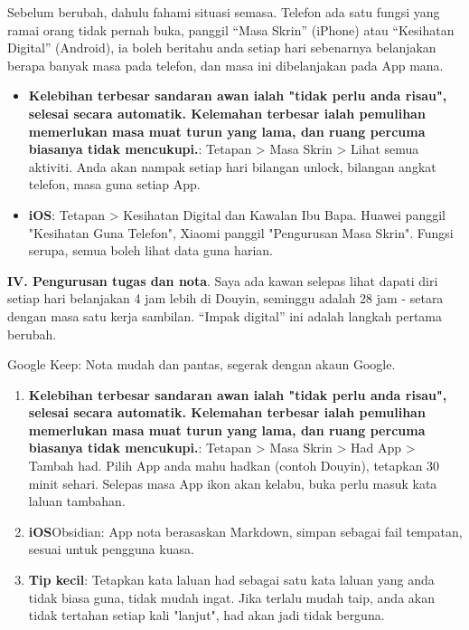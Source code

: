 


Sebelum berubah, dahulu fahami situasi semasa. Telefon ada satu fungsi yang ramai orang tidak pernah buka, panggil “Masa Skrin” (iPhone) atau “Kesihatan Digital” (Android), ia boleh beritahu anda setiap hari sebenarnya belanjakan berapa banyak masa pada telefon, dan masa ini dibelanjakan pada App mana.

\begin{itemize}
  \item \textbf{Kelebihan terbesar sandaran awan ialah "tidak perlu anda risau", selesai secara automatik. Kelemahan terbesar ialah pemulihan memerlukan masa muat turun yang lama, dan ruang percuma biasanya tidak mencukupi.}: Tetapan > Masa Skrin > Lihat semua aktiviti. Anda akan nampak setiap hari bilangan unlock, bilangan angkat telefon, masa guna setiap App.
  \item \textbf{iOS}: Tetapan > Kesihatan Digital dan Kawalan Ibu Bapa. Huawei panggil "Kesihatan Guna Telefon", Xiaomi panggil "Pengurusan Masa Skrin". Fungsi serupa, semua boleh lihat data guna harian.
\end{itemize}

\textbf{IV. Pengurusan tugas dan nota}. Saya ada kawan selepas lihat dapati diri setiap hari belanjakan 4 jam lebih di Douyin, seminggu adalah 28 jam - setara dengan masa satu kerja sambilan. “Impak digital” ini adalah langkah pertama berubah.


Google Keep: Nota mudah dan pantas, segerak dengan akaun Google.

\begin{enumerate}
  \item \textbf{Kelebihan terbesar sandaran awan ialah "tidak perlu anda risau", selesai secara automatik. Kelemahan terbesar ialah pemulihan memerlukan masa muat turun yang lama, dan ruang percuma biasanya tidak mencukupi.}: Tetapan > Masa Skrin > Had App > Tambah had. Pilih App anda mahu hadkan (contoh Douyin), tetapkan 30 minit sehari. Selepas masa App ikon akan kelabu, buka perlu masuk kata laluan tambahan.
  \item \textbf{iOS}Obsidian: App nota berasaskan Markdown, simpan sebagai fail tempatan, sesuai untuk pengguna kuasa.
  \item \textbf{Tip kecil}: Tetapkan kata laluan had sebagai satu kata laluan yang anda tidak biasa guna, tidak mudah ingat. Jika terlalu mudah taip, anda akan tidak tertahan setiap kali "lanjut", had akan jadi tidak berguna.
\end{enumerate}

